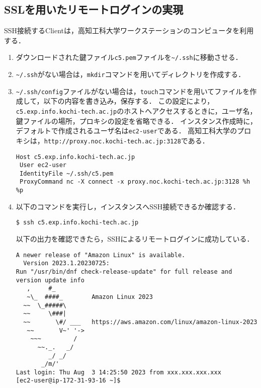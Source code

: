 \subsection{SSLを用いたリモートログインの実現}
SSH接続するClientは，高知工科大学ワークステーションのコンピュータを利用する．
\begin{enumerate}
    \item ダウンロードされた鍵ファイル\texttt{c5.pem}ファイルを\texttt{\textasciitilde/.ssh}に移動させる．
    \item \texttt{\textasciitilde/.ssh}がない場合は，\texttt{mkdir}コマンドを用いてディレクトリを作成する．
    \item \texttt{\textasciitilde/.ssh/config}ファイルがない場合は，\texttt{touch}コマンドを用いてファイルを作成して，以下の内容を書き込み，保存する．
          この設定により，\texttt{c5.exp.info.kochi-tech.ac.jp}のホストへアクセスするときに，ユーザ名，鍵ファイルの場所，プロキシの設定を省略できる．
          インスタンス作成時に，デフォルトで作成されるユーザ名は\texttt{ec2-user}である．
          高知工科大学のプロキシは，\texttt{http://proxy.noc.kochi-tech.ac.jp:3128}である．
          \begin{lstlisting}[style=file,caption={\ttfamily \textasciitilde/.ssh/config},escapechar={}]
Host c5.exp.info.kochi-tech.ac.jp
 User ec2-user
 IdentityFile ~/.ssh/c5.pem
 ProxyCommand nc -X connect -x proxy.noc.kochi-tech.ac.jp:3128 %h %p
        \end{lstlisting}
    \item 以下のコマンドを実行し，インスタンスへSSH接続できるか確認する．
          \begin{lstlisting}
$ ssh c5.exp.info.kochi-tech.ac.jp
          \end{lstlisting}
          以下の出力を確認できたら，SSHによるリモートログインに成功している．
          \begin{lstlisting}
A newer release of "Amazon Linux" is available.
  Version 2023.1.20230725:
Run "/usr/bin/dnf check-release-update" for full release and version update info
   ,     #_
   ~\_  ####_        Amazon Linux 2023
  ~~  \_#####\
  ~~     \###|
  ~~       \#/ ___   https://aws.amazon.com/linux/amazon-linux-2023
   ~~       V~' '->
    ~~~         /
      ~~._.   _/
         _/ _/
       _/m/'
Last login: Thu Aug  3 14:25:50 2023 from xxx.xxx.xxx.xxx
[ec2-user@ip-172-31-93-16 ~]$ 
\end{lstlisting}
\end{enumerate}
